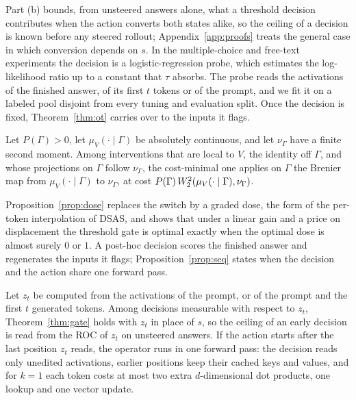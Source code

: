 Part (b) bounds, from unsteered answers alone, what a threshold decision
contributes when the action converts both states alike, so the ceiling of a
decision is known before any steered rollout; Appendix~\ref{app:proofs} treats
the general case in which conversion depends on $s$. In the multiple-choice and free-text experiments the decision is a
logistic-regression probe, which estimates the log-likelihood ratio up to a
constant that $\tau$ absorbs. The probe reads the activations of the finished
answer, of its first $t$ tokens or of the prompt, and we fit it on a labeled
pool disjoint from every tuning and evaluation split. Once the decision is
fixed, Theorem~\ref{thm:ot} carries over to the inputs it
flags.

\begin{theorem}
\label{thm:joint}
Let $P(\Gamma)>0$, let $\mu_V(\cdot\mid\Gamma)$ be absolutely continuous, and
let $\nu_\Gamma$ have a finite second moment. Among interventions that are
local to $V$, the identity off $\Gamma$, and whose projections on $\Gamma$
follow $\nu_\Gamma$, the cost-minimal one applies on $\Gamma$ the Brenier map
from $\mu_V(\cdot\mid\Gamma)$ to $\nu_\Gamma$, at cost
$P(\Gamma)\,W_2^2(\mu_V(\cdot\mid\Gamma),\nu_\Gamma)$.
\end{theorem}

Proposition~\ref{prop:dose} replaces the switch by a graded dose, the form
of the per-token interpolation of DSAS, and shows that under a linear gain and
a price on displacement the threshold gate is optimal exactly when the optimal
dose is almost surely $0$ or $1$. A post-hoc decision
scores the finished answer and regenerates the inputs it flags;
Proposition~\ref{prop:seq} states when the decision and the action share one
forward pass.

\begin{proposition}
\label{prop:seq}
Let $z_t$ be computed from the activations of the prompt, or of the prompt and
the first $t$ generated tokens. Among decisions measurable with respect to
$z_t$, Theorem~\ref{thm:gate} holds with $z_t$ in place of $s$, so the ceiling
of an early decision is read from the ROC of $z_t$ on unsteered answers. If the
action starts after the last position $z_t$ reads, the operator runs in one
forward pass: the decision reads only unedited activations, earlier positions
keep their cached keys and values, and for $k=1$ each token costs at most two extra
$d$-dimensional dot products, one lookup and one vector update.
\end{proposition}
